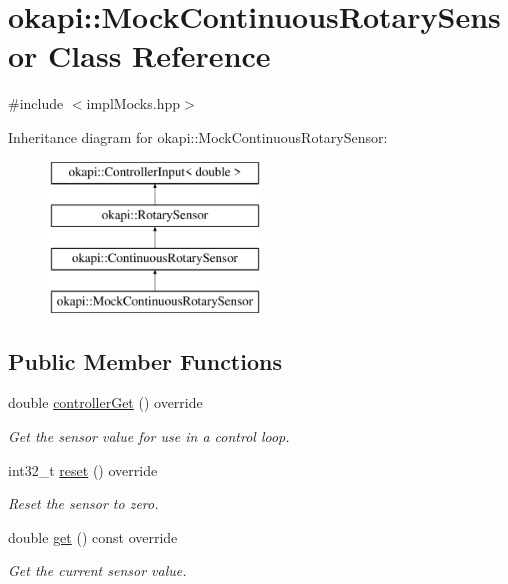 \hypertarget{classokapi_1_1MockContinuousRotarySensor}{}\section{okapi\+::Mock\+Continuous\+Rotary\+Sensor Class Reference}
\label{classokapi_1_1MockContinuousRotarySensor}


{\ttfamily \#include $<$impl\+Mocks.\+hpp$>$}

Inheritance diagram for okapi\+::Mock\+Continuous\+Rotary\+Sensor\+:\begin{figure}[H]
\begin{center}
\leavevmode
\includegraphics[height=4.000000cm]{classokapi_1_1MockContinuousRotarySensor}
\end{center}
\end{figure}
\subsection*{Public Member Functions}
\begin{DoxyCompactItemize}
\item 
double \mbox{\hyperlink{classokapi_1_1MockContinuousRotarySensor_acf954e463b18a377b1867fa66f89b319}{controller\+Get}} () override
\begin{DoxyCompactList}\small\item\em Get the sensor value for use in a control loop. \end{DoxyCompactList}\item 
int32\+\_\+t \mbox{\hyperlink{classokapi_1_1MockContinuousRotarySensor_aef9f58389e38fee29453983cf2179934}{reset}} () override
\begin{DoxyCompactList}\small\item\em Reset the sensor to zero. \end{DoxyCompactList}\item 
double \mbox{\hyperlink{classokapi_1_1MockContinuousRotarySensor_a957dab6455bb40bf8bf848d521f3e207}{get}} () const override
\begin{DoxyCompactList}\small\item\em Get the current sensor value. \end{DoxyCompactList}\end{DoxyCompactItemize}
